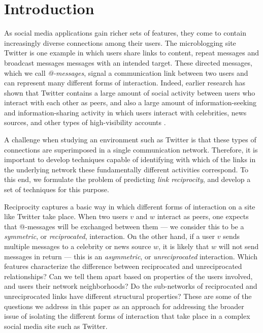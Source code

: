 \documentclass[conference]{IEEEtran}
\begin{document}
\section{Introduction}

As social media applications gain richer sets of features,
they come to contain increasingly diverse 
connections among their users.
The microblogging site Twitter is one example in which users share
links to content, repeat messages and broadcast messages messages with an 
intended target.  These directed messages, which we call \emph{@-messages}, 
signal a communication link between two users and 
can represent many different forms of interaction.
Indeed, earlier research has shown that Twitter contains
a large amount of social activity between users who interact
with each other as peers, and also a large amount of information-seeking
and information-sharing activity in which users interact with
celebrities, news sources, and other types of high-visibility accounts
\cite{kwak-what-is-twitter,romero-directed-closure}.

A challenge when studying an environment such as Twitter
is that these types of connections are superimposed 
in a single communication network.
Therefore, it is important to develop techniques capable of identifying with which of
the links in the underlying network these fundamentally different activities correspond.
To this end, we formulate the problem of predicting
{\em link reciprocity}, and develop a set of techniques for this purpose.

Reciprocity captures a basic way in which different forms of
interaction on a site like Twitter take place.
When two users $v$ and $w$ interact as peers, one expects that @-messages
will be exchanged between them --- we consider
this to be a {\em symmetric}, or {\em reciprocated}, interaction.
On the other hand, if a user $v$ sends multiple messages to a
celebrity or news source $w$, it is likely that $w$ will not
send messages in return --- this is an
{\em asymmetric}, or {\em unreciprocated} interaction.
Which features characterize the difference between reciprocated and
unreciprocated relationships?  Can we tell them apart based on
properties of the users involved, and users their network neighborhoods?
Do the sub-networks of reciprocated and unreciprocated links have
different structural properties?
These are some of the questions we address in this paper as an
approach for addressing the broader issue of isolating the different
forms of interaction that take place in a complex social media 
site such as Twitter.
\end{document}
